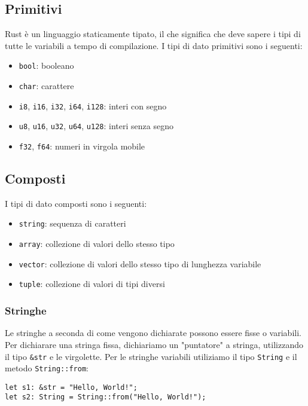 \documentclass[12pt]{article}
\begin{document}
\subsection{Primitivi}
Rust è un linguaggio staticamente tipato, il che significa che
deve sapere i tipi di tutte le variabili a tempo di compilazione.
I tipi di dato primitivi sono i seguenti:
\begin{itemize}
    \item \texttt{bool}: booleano
    \item \texttt{char}: carattere
    \item \texttt{i8}, \texttt{i16}, \texttt{i32}, \texttt{i64}, \texttt{i128}: interi con segno
    \item \texttt{u8}, \texttt{u16}, \texttt{u32}, \texttt{u64}, \texttt{u128}: interi senza segno
    \item \texttt{f32}, \texttt{f64}: numeri in virgola mobile
\end{itemize}

\subsection{Composti}
I tipi di dato composti sono i seguenti:
\begin{itemize}
    \item \texttt{string}: sequenza di caratteri
    \item \texttt{array}: collezione di valori dello stesso tipo
    \item \texttt{vector}: collezione di valori dello stesso tipo di lunghezza variabile
    \item \texttt{tuple}: collezione di valori di tipi diversi    
\end{itemize}

\subsubsection{Stringhe}
Le stringhe a seconda di come vengono dichiarate possono essere
fisse o variabili. Per dichiarare una stringa fissa, dichiariamo
un "puntatore" a stringa, utilizzando il tipo \texttt{\&str} e le virgolette.
Per le stringhe variabili utiliziamo il tipo \texttt{String} e 
il metodo \texttt{String::from}:
\begin{verbatim}
let s1: &str = "Hello, World!";
let s2: String = String::from("Hello, World!");
\end{verbatim}
\end{document}
